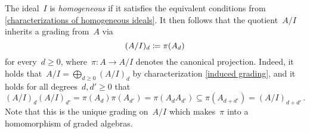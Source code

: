 \documentclass[a4paper,10pt,numbers = noenddot]{scrartcl}
\begin{document}
The ideal~$I$ is \emph{homogeneous} if it satisfies the equivalent conditions from \cref{characterizations of homogeneous ideals}.
It then follows that the quotient~$A/I$ inherits a grading from~$A$ via
\[
            (A/I)_d
  \coloneqq  \pi(A_d)
\]
for every~$d \geq 0$, where~$\pi \colon A \to A/I$ denotes the canonical projection.
Indeed, it holds that~$A/I = \bigoplus_{d \geq 0} (A/I)_d$ by characterization \ref*{induced grading}, and it holds for all degrees~$d, d' \geq 0$ that
\[
            (A/I)_d (A/I)_{d'}
  =         \pi(A_d) \pi(A_{d'})
  =         \pi(A_d A_{d'})
  \subseteq \pi(A_{d+d'})
  =         (A/I)_{d+d'} \,.
\]
Note that this is the unique grading on~$A/I$ which makes~$\pi$ into a homomorphism of graded algebras.


%       
\end{document}
